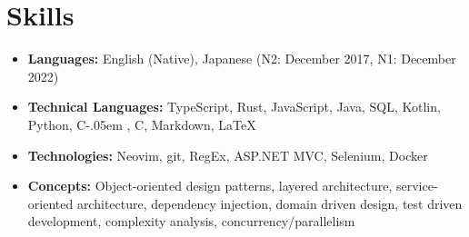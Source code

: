 \documentclass[letterpaper,11pt]{article}
\newcommand{\resumeItem}[2]{
    \vspace{-2pt}
    \item\small{
        \textbf{#1}{ #2 \vspace{-2pt}}
    }
}
\newcommand{\resumeSubItem}[2]{\resumeItem{#1}{#2}}
\def\Cplusplus{C\raisebox{0.5ex}{\tiny\textbf{++}}}
\newcommand{\Csharp}{%
  {\settoheight{\dimen0}{C}C\kern-.05em \resizebox{!}{\dimen0}{\raisebox{\depth}{\#}}}}
\begin{document}
\section{\textbf{Skills}}
\begin{itemize}
    \resumeSubItem{\textbf{Languages:}}
        {
            English (Native),
            Japanese (N2: December 2017, N1: December 2022)
        }
    \resumeSubItem{\textbf{Technical Languages:}}
        {
            TypeScript,
            Rust,
            JavaScript,
            Java,
            SQL,
            Kotlin,
            Python,
            \Csharp,
            \Cplusplus,
            Markdown,
            \LaTeX
        }
    \resumeSubItem{\textbf{Technologies:}}
        {
            Neovim,
            git,
            RegEx,
            ASP.NET MVC,
            Selenium,
            Docker
        }
    \resumeSubItem{\textbf{Concepts:}}
        {
            Object-oriented design patterns,
            layered architecture,
            service-oriented architecture,
            dependency injection,
            domain driven design,
            test driven development,
            complexity analysis,
            concurrency/parallelism
        }
 \end{itemize}

\end{document}
